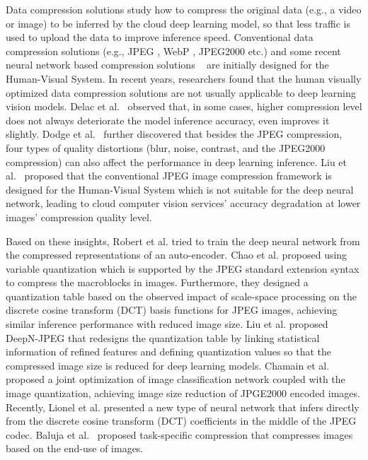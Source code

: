 Data compression solutions study how to compress the original data (e.g., a video or image) to be inferred by the cloud deep learning model, so that less traffic is used to upload the data to improve inference speed. Conventional data compression solutions (e.g., JPEG \cite{jpeg}, WebP \cite{calore2010meet}, JPEG2000 \cite{rabbani2002jpeg2000} etc.) and some recent neural network based compression solutions ~\cite{toderici2017full,theis2017lossy,toderici2015variable, rippel2017real} are initially designed for the Human-Visual System. In recent years, researchers found that the human visually optimized data compression solutions are not usually applicable to deep learning vision models. Delac et al.~\cite{delac2005effects} observed that, in some cases, higher compression level does not always deteriorate the model inference accuracy, even improves it slightly. Dodge et al.~\cite{dodge2016understanding} further discovered that besides the JPEG compression, four types of quality distortions (blur, noise, contrast, and the JPEG2000 compression) can also affect the performance in deep learning inference. Liu et al.~\cite{DeepN-JPEG} proposed that the conventional JPEG image compression framework is designed for the Human-Visual System which is not suitable for the deep neural network, leading to cloud computer vision services' accuracy degradation at lower images' compression quality level. %

Based on these insights, Robert et al. \cite{torfason2018towards} tried to train the deep neural network from the compressed representations of an auto-encoder. Chao et al. \cite{chao2011preserving} proposed using variable quantization which is supported by the JPEG standard extension syntax \cite{dis199110918} to compress the macroblocks in images. Furthermore, they \cite{chao2013design} designed a quantization table based on the observed impact of scale-space processing on the discrete cosine transform (DCT) basis functions for JPEG images, achieving similar inference performance with reduced image size. Liu et al. \cite{DeepN-JPEG} proposed DeepN-JPEG that redesigns the quantization table by linking statistical information of refined features and defining quantization values so that the compressed image size is reduced for deep learning models. Chamain et al. \cite{2019quannet} proposed a joint optimization of image classification network coupled with the image quantization, achieving image size reduction of JPGE2000 \cite{rabbani2002jpeg2000} encoded images. Recently, Lionel et al. \cite{gueguen2018faster} presented a new type of neural network that infers directly from the discrete cosine transform (DCT) coefficients in the middle of the JPEG codec. Baluja et al.~\cite{baluja2019task} proposed task-specific compression that compresses images based on the end-use of images. %

